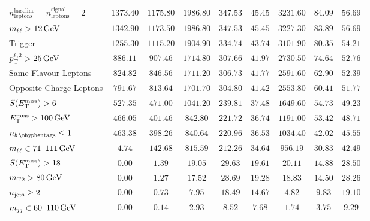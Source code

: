 \begin{sidewaystable}[tp]
{\begin{tabular}{lcccccccc}
$n_\mathrm{leptons}^\mathrm{baseline} = n_\mathrm{leptons}^\mathrm{signal} = 2$     & $1373.40$ & $1175.80$ & $1986.80$ & $347.53$ & $45.45$ & $3231.60$ & $84.09$ & $56.69$ \\
$\mll > 12\,\eV[G]$                                          & $1342.90$ & $1173.50$ & $1986.80$ & $347.53$ & $45.45$ & $3227.30$ & $83.89$ & $56.69$ \\
Trigger                                                   & $1255.30$ & $1115.20$ & $1904.90$ & $334.74$ & $43.74$ & $3101.90$ & $80.35$ & $54.21$ \\
$\pt^{\ell,2} > 25\,\eV[G]$                         & $886.11$ & $907.46$ & $1714.80$ & $307.66$ & $41.97$ & $2730.50$ & $74.64$ & $52.76$ \\
Same Flavour Leptons                                       & $824.82$ & $846.56$ & $1711.20$ & $306.73$ & $41.77$ & $2591.60$ & $62.90$ & $52.39$ \\
Opposite Charge Leptons                                   & $791.67$ & $813.64$ & $1701.70$ & $304.80$ & $41.42$ & $2553.80$ & $60.41$ & $51.77$ \\
$\metsig > 6$                                               & $527.35$ & $471.00$ & $1041.20$ & $239.81$ & $37.48$ & $1649.60$ & $54.73$ & $49.23$ \\
$\met > 100\,\eV[G]$                                           & $466.05$ & $401.46$ & $842.80$ & $221.72$ & $36.74$ & $1191.00$ & $53.42$ & $48.71$ \\
\hline
$\nbtag \leq 1$                                          & $463.38$ & $398.26$ & $840.64$ & $220.96$ & $36.53$ & $1034.40$ & $42.02$ & $45.55$ \\
$\mll \in 71\textrm{--}111\,\eV[G]$                            & $4.74$ & $142.68$ & $815.59$ & $212.26$ & $34.64$ & $956.19$ & $30.83$ & $42.49$ \\
$\metsig > 18$                                            & $0.00$ & $1.39$ & $19.05$ & $29.63$ & $19.61$ & $20.11$ & $14.88$ & $28.50$ \\
$\mttwo > 80\,\eV[G]$                                        & $0.00$ & $1.27$ & $17.52$ & $28.69$ & $19.28$ & $18.83$ & $14.50$ & $28.26$ \\
$\njet \geq 2$                               & $0.00$ & $0.73$ & $7.95$ & $18.49$ & $14.67$ & $4.82$ & $9.83$ & $19.10$ \\
$\mjj \in 60\text{--}110\,\eV[G]$                            & $0.00$ & $0.14$ & $2.93$ & $8.52$ & $7.68$ & $1.74$ & $3.75$ & $9.29$ \\

\end{tabular}}
\end{sidewaystable}
